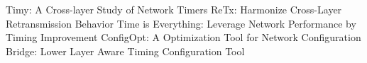 Timy: A Cross-layer Study of Network Timers
ReTx: Harmonize Cross-Layer Retransmission Behavior
Time is Everything: Leverage Network Performance by Timing Improvement
ConfigOpt: A Optimization Tool for Network Configuration 
Bridge: Lower Layer Aware Timing Configuration Tool
